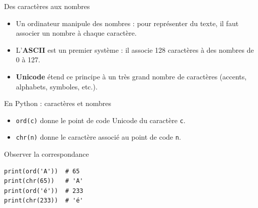\documentclass[10pt]{beamer}
\begin{document}
\begin{frame}[fragile]{Des caractères aux nombres}

\begin{itemize}
    \item Un ordinateur manipule des nombres : pour représenter du texte,
    il faut associer un nombre à chaque caractère.
    \item L'\textbf{ASCII} est un premier système : il associe 128 caractères
    à des nombres de 0 à 127.
    \item \textbf{Unicode} étend ce principe à un très grand nombre de
    caractères (accents, alphabets, symboles, etc.).
\end{itemize}

\begin{block}{En Python : caractères et nombres}
    \small
    \begin{itemize}
        \item \texttt{ord(c)} donne le point de code Unicode du caractère \texttt{c}.
        \item \texttt{chr(n)} donne le caractère associé au point de code \texttt{n}.
    \end{itemize}
\end{block}

\begin{exampleblock}{Observer la correspondance}
\small
\begin{lstlisting}
print(ord('A'))  # 65
print(chr(65))   # 'A'
print(ord('é'))  # 233
print(chr(233))  # 'é'
\end{lstlisting}
\end{exampleblock}




\end{frame}
\end{document}
